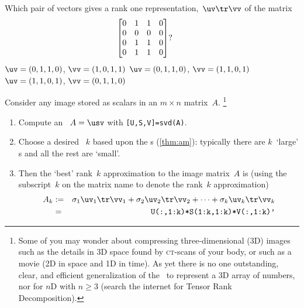 \begin{activity}
Which pair of vectors gives a rank one representation,~\(\uv\tr\vv\) of the matrix
\begin{align*}&
\begin{bmatrix} 0&1&1&0 
\\0&0&0&0
\\0&1&1&0
\\0&1&1&0 \end{bmatrix}?
&&\raisebox{-5ex}{}
\end{align*}
{\(\uv=(0,1,1,0)\), \(\vv=(1,0,1,1)\)}
{\(\uv=(0,1,1,0)\), \(\vv=(1,1,0,1)\)}
{\(\uv=(1,1,0,1)\), \(\vv=(0,1,1,0)\)}
\end{activity}





\begin{procedure} \label{pro:ai} 
Consider any image stored as scalars in an \(m\times n\) matrix~\(A\).%
\footnote{Some of you may wonder about compressing three-dimensional (3D) images such as the details in 3D space found by \textsc{ct}-scans of your body, or such as a movie (2D in space  and 1D in time). 
As yet there is no one outstanding, clear, and efficient generalization of the \svd\ to represent a 3D array of numbers, nor for \(n\)D with \(n\geq3\) (search the internet for Tensor Rank Decomposition).}
\begin{enumerate}
\item Compute an \svd\ \(A=\usv\) with \verb|[U,S,V]=svd(A)|.
\item Choose a desired ~\(k\) based upon the s (\cref{thm:am}): typically there are \(k\)~`large' s and all the rest are `small'.
\item Then the `best' rank~\(k\) approximation to the image matrix~\(A\) is (using the subscript~\(k\) on the matrix name to denote the rank~\(k\) approximation)
\begin{eqnarray*}
A_k&:=&\sigma_1\uv_1\tr\vv_1+\sigma_2\uv_2\tr\vv_2+\cdots+\sigma_k\uv_k\tr\vv_k
\\&=&\verb|U(:,1:k)*S(1:k,1:k)*V(:,1:k)'|
\end{eqnarray*}
\end{enumerate}
\end{procedure}






